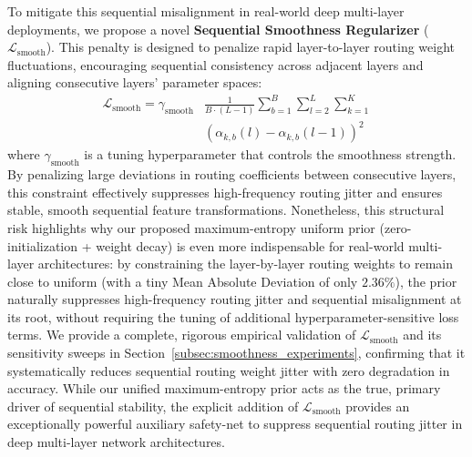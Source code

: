 To mitigate this sequential misalignment in real-world deep multi-layer deployments, we propose a novel \textbf{Sequential Smoothness Regularizer} ($\mathcal{L}_{\text{smooth}}$). This penalty is designed to penalize rapid layer-to-layer routing weight fluctuations, encouraging sequential consistency across adjacent layers and aligning consecutive layers' parameter spaces:
\begin{equation}
\begin{split}
    \mathcal{L}_{\text{smooth}} = \gamma_{\text{smooth}} & \frac{1}{B \cdot (L-1)} \sum_{b=1}^B \sum_{l=2}^L \sum_{k=1}^K \\
    & \left( \alpha_{k, b}(l) - \alpha_{k, b}(l-1) \right)^2
\end{split}
\end{equation}
where $\gamma_{\text{smooth}}$ is a tuning hyperparameter that controls the smoothness strength. By penalizing large deviations in routing coefficients between consecutive layers, this constraint effectively suppresses high-frequency routing jitter and ensures stable, smooth sequential feature transformations. Nonetheless, this structural risk highlights why our proposed maximum-entropy uniform prior (zero-initialization + weight decay) is even more indispensable for real-world multi-layer architectures: by constraining the layer-by-layer routing weights to remain close to uniform (with a tiny Mean Absolute Deviation of only $2.36\%$), the prior naturally suppresses high-frequency routing jitter and sequential misalignment at its root, without requiring the tuning of additional hyperparameter-sensitive loss terms. We provide a complete, rigorous empirical validation of $\mathcal{L}_{\text{smooth}}$ and its sensitivity sweeps in Section~\ref{subsec:smoothness_experiments}, confirming that it systematically reduces sequential routing weight jitter with zero degradation in accuracy. While our unified maximum-entropy prior acts as the true, primary driver of sequential stability, the explicit addition of $\mathcal{L}_{\text{smooth}}$ provides an exceptionally powerful auxiliary safety-net to suppress sequential routing jitter in deep multi-layer network architectures.

